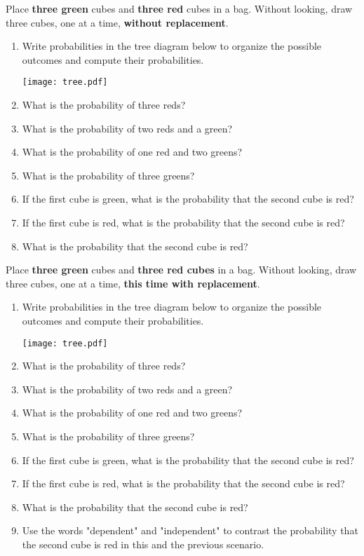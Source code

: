\documentclass[nooutcomes]{ximera}
\begin{document}
\begin{problem}
Place \textbf{three green} cubes and \textbf{three red} cubes in a bag.  Without looking, draw three cubes, one at a time, \textbf{without replacement}.  
\begin{enumerate}
\item Write probabilities in the tree diagram below to organize the possible outcomes and compute their probabilities.  
\begin{image}
\texttt{[image: tree.pdf]}
\end{image}
\vspace{.15in}
\item What is the probability of three reds? 
\item What is the probability of two reds and a green? 
\item What is the probability of one red and two greens? 
\item What is the probability of three greens? 
\item If the first cube is green, what is the probability that the second cube is red? 
\item If the first cube is red, what is the probability that the second cube is red? 
\item What is the probability that the second cube is red?  
\end{enumerate}
\end{problem}

\newpage
\begin{problem}
Place \textbf{three green} cubes and \textbf{three red cubes} in a bag.  Without looking, draw three cubes, one at a time, \textbf{this time with replacement}.  
\begin{enumerate}
\item Write probabilities in the tree diagram below to organize the possible outcomes and compute their probabilities.  
\begin{image}
\texttt{[image: tree.pdf]}
\end{image}
\vspace{.15in}
\item What is the probability of three reds? 
\item What is the probability of two reds and a green? 
\item What is the probability of one red and two greens? 
\item What is the probability of three greens? 
\item If the first cube is green, what is the probability that the second cube is red? 
\item If the first cube is red, what is the probability that the second cube is red? 
\item What is the probability that the second cube is red?  
\item Use the words "dependent" and "independent" to contrast the probability that the second cube is red in this and the previous scenario.  
\end{enumerate}
\end{problem}
\end{document}
